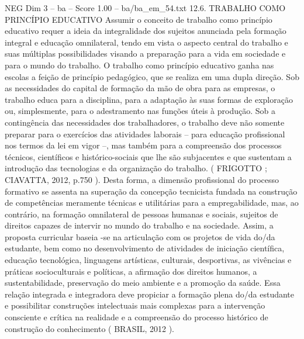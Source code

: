 \begin{textsample}{NEG Dim 3 – ba – Score 1.00 – ba/ba\_em\_54.txt}  \label{ex:f3_neg_120}
12.6.
TRABALHO COMO PRINCÍPIO EDUCATIVO Assumir o conceito de trabalho como princípio educativo requer a ideia da integralidade dos sujeitos anunciada pela formação integral e educação omnilateral, tendo em vista o aspecto central do trabalho e suas múltiplas possibilidades visando a preparação para a vida em sociedade e para o mundo do trabalho.
O trabalho como princípio educativo ganha nas escolas a feição de princípio pedagógico, que se realiza em uma dupla direção.
Sob as necessidades do capital de formação da mão de obra para as empresas, o trabalho educa para a disciplina, para a adaptação às suas formas de exploração ou, simplesmente, para o adestramento nas funções úteis à produção.
Sob a contingência das necessidades dos trabalhadores, o trabalho deve não somente preparar para o exercícios das atividades laborais – para educação profissional nos termos da lei em vigor –, mas também para a compreensão dos processos técnicos, científicos e histórico-sociais que lhe são subjacentes e que sustentam a introdução das tecnologias e da organização do trabalho. ( FRIGOTTO ; CIAVATTA, 2012, p.750 ).
Desta forma, a dimensão profissional do processo formativo se assenta na superação da concepção tecnicista fundada na construção de competências meramente técnicas e utilitárias para a empregabilidade, mas, ao contrário, na formação omnilateral de pessoas humanas e sociais, sujeitos de direitos capazes de intervir no mundo do trabalho e na sociedade.
Assim, a proposta curricular baseia -se na articulação com os projetos de vida do/da estudante, bem como no desenvolvimento de atividades de iniciação científica, educação tecnológica, linguagens artísticas, culturais, desportivas, as vivências e práticas socioculturais e políticas, a afirmação dos direitos humanos, a sustentabilidade, preservação do meio ambiente e a promoção da saúde.
Essa relação integrada e integradora deve propiciar a formação plena do/da estudante e possibilitar construções intelectuais mais complexas para a intervenção consciente e crítica na realidade e a compreensão do processo histórico de construção do conhecimento ( BRASIL, 2012 ).

\end{textsample}
